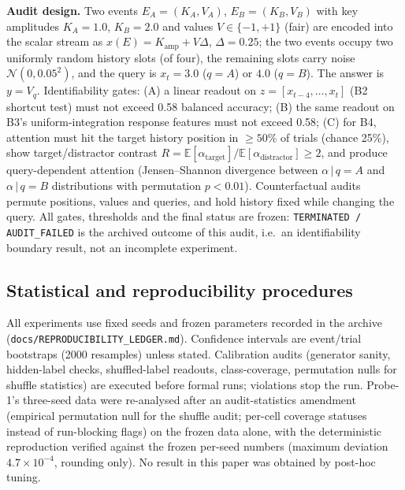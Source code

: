 \textbf{Audit design.} Two events $E_A = (K_A, V_A)$, $E_B = (K_B, V_B)$
with key amplitudes $K_A = 1.0$, $K_B = 2.0$ and values
$V \in \{-1,+1\}$ (fair) are encoded into the scalar stream as
$x(E) = K_{\text{amp}} + V\Delta$, $\Delta = 0.25$; the two events
occupy two uniformly random history slots (of four), the remaining slots
carry noise $\mathcal{N}(0, 0.05^2)$, and the query is
$x_t = 3.0$ ($q = A$) or $4.0$ ($q = B$).  The answer is
$y = V_q$.  Identifiability gates: (A) a linear readout on
$z = [x_{t-4},\dots,x_t]$ (B2 shortcut test) must not exceed 0.58
balanced accuracy; (B) the same readout on B3's uniform-integration
response features must not exceed 0.58; (C) for B4, attention must hit
the target history position in $\geq 50\%$ of trials (chance 25\%),
show target/distractor contrast $R = \mathbb{E}[\alpha_{\text{target}}]/
\mathbb{E}[\alpha_{\text{distractor}}] \geq 2$, and produce
query-dependent attention (Jensen--Shannon divergence between
$\alpha\,|\,q{=}A$ and $\alpha\,|\,q{=}B$ distributions with permutation
$p < 0.01$).  Counterfactual audits permute positions, values and
queries, and hold history fixed while changing the query.  All gates,
thresholds and the final status are frozen:
\texttt{TERMINATED / AUDIT\_FAILED} is the archived outcome of this
audit, i.e.\ an identifiability boundary result, not an incomplete
experiment.

\subsection{Statistical and reproducibility procedures}\label{sec:methods-stats}

All experiments use fixed seeds and frozen parameters recorded in the
archive (\texttt{docs/REPRODUCIBILITY\_LEDGER.md}).  Confidence intervals are
event/trial bootstraps (2000 resamples) unless stated.  Calibration
audits (generator sanity, hidden-label checks, shuffled-label readouts,
class-coverage, permutation nulls for shuffle statistics) are executed
before formal runs; violations stop the run.  Probe-1's three-seed data
were re-analysed after an audit-statistics amendment (empirical
permutation null for the shuffle audit; per-cell coverage statuses
instead of run-blocking flags) on the frozen data alone, with the
deterministic reproduction verified against the frozen per-seed numbers
(maximum deviation $4.7\times10^{-4}$, rounding only).  No result in
this paper was obtained by post-hoc tuning.
